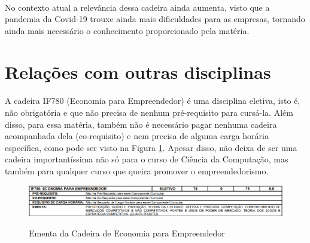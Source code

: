 \documentclass{article}
\begin{document}
\paragraph{} No contexto atual a relevância dessa cadeira ainda aumenta, visto que a pandemia da Covid-19 trouxe ainda mais dificuldades para as empresas, tornando ainda mais necessário o conhecimento proporcionado pela matéria. 
\newline \cite{stangherlin2020desafios}



\section{Relações com outras disciplinas}
\paragraph{} A cadeira IF780 (Economia para Empreendedor) é uma disciplina eletiva, isto é, não obrigatória e que não precisa de nenhum pré-requisito para cursá-la. Além disso, para essa matéria,  também não é necessário pagar nenhuma cadeira acompanhada dela (co-requisito) e nem precisa de alguma carga horária específica, como pode ser visto na Figura \ref{fig:Ementa}. Apesar disso, não deixa de ser uma cadeira importantíssima não só para o curso de Ciência da Computação, mas também para qualquer curso que queira promover o empreendedorismo.




\begin{figure}[h!]
\centering
\includegraphics[width=1\textwidth]{ementa.png}
\caption{Ementa da Cadeira de Economia para Empreendedor}\cite{ementa}
\label{fig:Ementa}

\end{figure}



\end{document}
